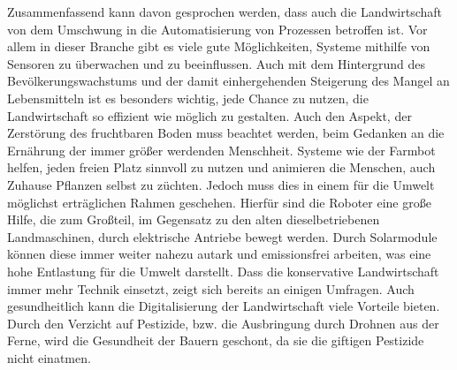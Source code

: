 Zusammenfassend kann davon gesprochen werden, dass auch die Landwirtschaft von dem
Umschwung in die Automatisierung von Prozessen betroffen ist. Vor allem in
dieser Branche gibt es viele gute Möglichkeiten, Systeme mithilfe von Sensoren
zu überwachen und zu beeinflussen. Auch mit dem Hintergrund des
Bevölkerungswachstums und der damit einhergehenden Steigerung des Mangel an
Lebensmitteln ist es besonders wichtig, jede Chance zu nutzen, die
Landwirtschaft so effizient wie möglich zu gestalten. Auch den Aspekt, der
Zerstörung des fruchtbaren Boden muss beachtet werden, beim Gedanken an die
Ernährung der immer größer werdenden Menschheit.\cite{rainer2003diskurs}
Systeme wie der Farmbot helfen, jeden freien Platz sinnvoll zu nutzen und
animieren die Menschen, auch Zuhause Pflanzen selbst zu züchten. Jedoch muss
dies in einem für die Umwelt möglichst erträglichen Rahmen geschehen. Hierfür
sind die Roboter eine große Hilfe, die zum Großteil, im Gegensatz zu den alten
dieselbetriebenen Landmaschinen, durch elektrische Antriebe bewegt werden.
Durch Solarmodule können diese immer weiter nahezu autark und emissionsfrei
arbeiten, was eine hohe Entlastung für die Umwelt darstellt. Dass die
konservative Landwirtschaft immer mehr Technik einsetzt, zeigt sich bereits an
einigen Umfragen. 
Auch gesundheitlich kann die Digitalisierung der
Landwirtschaft viele Vorteile bieten. Durch den Verzicht auf Pestizide, bzw.
die Ausbringung durch Drohnen aus der Ferne, wird die Gesundheit der Bauern
geschont, da sie die giftigen Pestizide nicht einatmen.
\cite{jungwirth2022arbeitszeitbedarf}